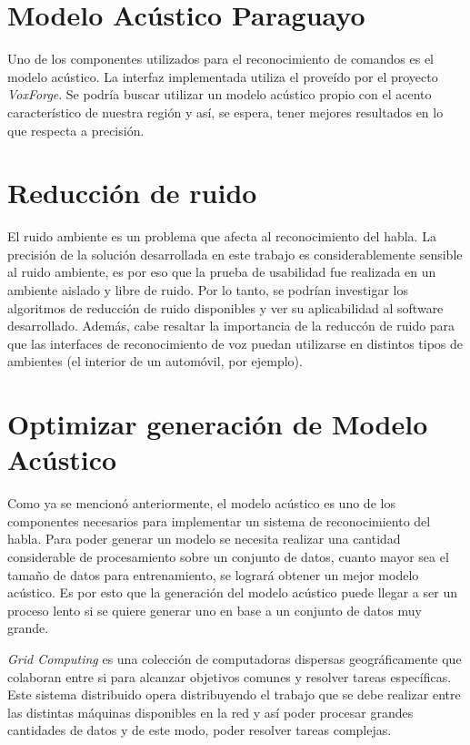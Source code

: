 \section{Modelo Ac\'ustico Paraguayo} 

Uno de los componentes utilizados para el reconocimiento de comandos es el modelo ac\'ustico. La interfaz implementada
utiliza el prove\'ido por el proyecto \emph{VoxForge}. Se podr\'ia buscar utilizar un modelo ac\'ustico propio con el
acento caracter\'istico de nuestra regi\'on y as\'i, se espera, tener mejores resultados en lo que respecta a precisi\'on.

\section{Reducci\'on de ruido}

El ruido ambiente es un problema que afecta al reconocimiento del habla. La precisi\'on de la soluci\'on desarrollada en este trabajo es 
considerablemente sensible al ruido ambiente, es por eso que la prueba de usabilidad fue realizada en un ambiente aislado
y libre de ruido. Por lo tanto, se podr\'ian investigar los algoritmos de reducci\'on de ruido disponibles y ver su aplicabilidad
al software desarrollado. Adem\'as, cabe resaltar la importancia de la reducc\'on de ruido para que las interfaces de reconocimiento
de voz puedan utilizarse en distintos tipos de ambientes (el interior de un autom\'ovil, por ejemplo).

\section{Optimizar generaci\'on de Modelo Ac\'ustico}

Como ya se mencion\'o anteriormente, el modelo ac\'ustico es uno de los componentes necesarios para implementar un sistema de 
reconocimiento del habla. Para poder generar un modelo se necesita realizar una cantidad considerable de procesamiento sobre
un conjunto de datos, cuanto mayor sea el tama\~no de datos para entrenamiento, se lograr\'a obtener un mejor modelo ac\'ustico. Es por
esto que la generaci\'on del modelo ac\'ustico puede llegar a ser un proceso lento si se quiere generar uno en base a un conjunto de datos
muy grande.

\emph{Grid Computing} es una colecci\'on de computadoras dispersas geogr\'aficamente que colaboran entre si para alcanzar objetivos comunes y resolver
tareas espec\'ificas. Este sistema distribuido opera distribuyendo el trabajo que se debe realizar entre las distintas m\'aquinas disponibles en la red
y as\'i poder procesar grandes cantidades de datos y de este modo, poder resolver tareas complejas.


